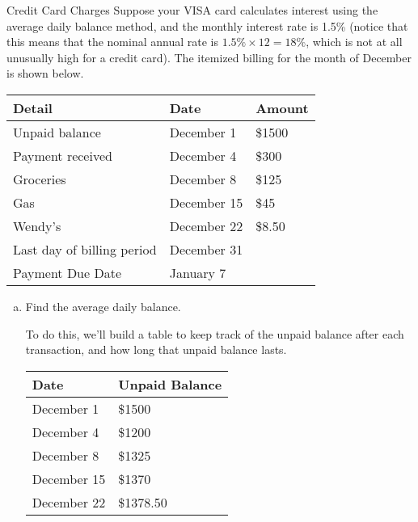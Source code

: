 \begin{example}[https://www.youtube.com/watch?v=ZUEQu_e2TqY]{Credit Card Charges}
Suppose your VISA card calculates interest using the average daily balance method, and the monthly interest rate is 1.5\% (notice that this means that the nominal annual rate is $1.5\% \times 12 = 18\%$, which is not at all unusually high for a credit card).  The itemized billing for the month of December is shown below.
\begin{center}
\begin{tabular}{l l l}
Detail & Date & Amount\\
\hline
Unpaid balance & December 1 & \$1500\\
Payment received & December 4 & \$300\\
Groceries & December 8 & \$125\\
Gas & December 15 & \$45\\
Wendy's & December 22 & \$8.50\\
Last day of billing period & December 31 &\\
Payment Due Date & January 7 &\\
\end{tabular}
\end{center}

\begin{enumerate}[(a)]
\item Find the average daily balance.

To do this, we'll build a table to keep track of the unpaid balance after each transaction, and how long that unpaid balance lasts.

\begin{center}
\begin{tabular}{l l}
Date & Unpaid Balance\\
\hline
December 1 & \$1500\\
December 4 & \$1200\\
December 8 & \$1325\\
December 15 & \$1370\\
December 22 & \$1378.50\\
\end{tabular}
\end{center}


\end{enumerate}
\end{example}
